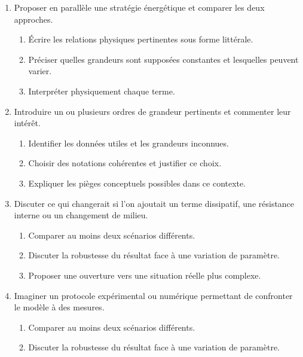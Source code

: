 \documentclass[11pt,a4paper]{article}
\begin{document}
\begin{enumerate}[label=\textbf{Très long \arabic*.},leftmargin=*]
\begin{enumerate}[label=\textbf{\arabic*)}]
\begin{enumerate}[label=\alph*)]
\item Écrire les relations physiques pertinentes sous forme littérale.
\item Préciser quelles grandeurs sont supposées constantes et lesquelles peuvent varier.
\item Interpréter physiquement chaque terme.
\end{enumerate}
\item Proposer en parallèle une stratégie énergétique et comparer les deux approches.
\begin{enumerate}[label=\alph*)]
\item Écrire les relations physiques pertinentes sous forme littérale.
\item Préciser quelles grandeurs sont supposées constantes et lesquelles peuvent varier.
\item Interpréter physiquement chaque terme.
\end{enumerate}
\item Introduire un ou plusieurs ordres de grandeur pertinents et commenter leur intérêt.
\begin{enumerate}[label=\alph*)]
\item Identifier les données utiles et les grandeurs inconnues.
\item Choisir des notations cohérentes et justifier ce choix.
\item Expliquer les pièges conceptuels possibles dans ce contexte.
\end{enumerate}
\item Discuter ce qui changerait si l'on ajoutait un terme dissipatif, une résistance interne ou un changement de milieu.
\begin{enumerate}[label=\alph*)]
\item Comparer au moins deux scénarios différents.
\item Discuter la robustesse du résultat face à une variation de paramètre.
\item Proposer une ouverture vers une situation réelle plus complexe.
\end{enumerate}
\item Imaginer un protocole expérimental ou numérique permettant de confronter le modèle à des mesures.
\begin{enumerate}[label=\alph*)]
\item Comparer au moins deux scénarios différents.
\item Discuter la robustesse du résultat face à une variation de paramètre.

\end{enumerate}
\end{enumerate}
\end{enumerate}
\end{document}
